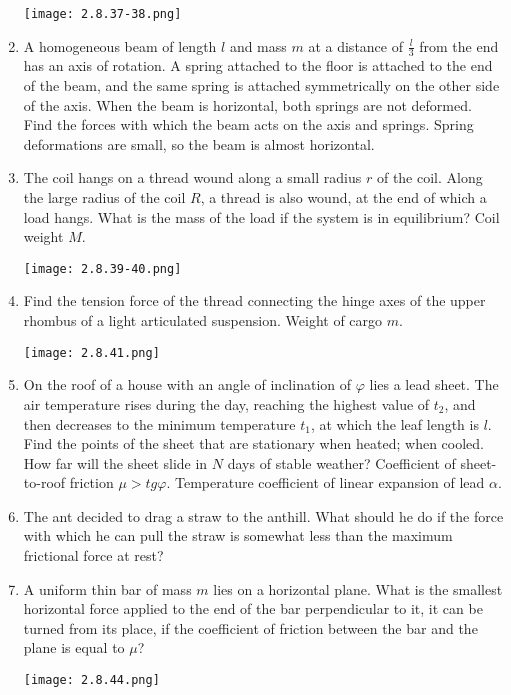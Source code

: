 \documentclass{article}
\begin{document}
\begin{enumerate}[label=2.8.\arabic*]
\begin{center}
    \texttt{[image: 2.8.37-38.png]}
\end{center}

\item A homogeneous beam of length $l$ and mass $m$ at a distance of $\frac{l}{3}$ from the end has an axis of rotation. A spring attached to the floor is attached to the end of the beam, and the same spring is attached symmetrically on the other side of the axis. When the beam is horizontal, both springs are not deformed. Find the forces with which the beam acts on the axis and springs. Spring deformations are small, so the beam is almost horizontal.

\item The coil hangs on a thread wound along a small radius $r$ of the coil. Along the large radius of the coil $R$, a thread is also wound, at the end of which a load hangs. What is the mass of the load if the system is in equilibrium? Coil weight $M$.

\begin{center}
    \texttt{[image: 2.8.39-40.png]}
\end{center}

\item Find the tension force of the thread connecting the hinge axes of the upper rhombus of a light articulated suspension. Weight of cargo $m$.

\begin{center}
    \texttt{[image: 2.8.41.png]}
\end{center}

\item On the roof of a house with an angle of inclination of $\varphi$ lies a lead sheet. The air temperature rises during the day, reaching the highest value of $t_2$, and then decreases to the minimum temperature $t_1$, at which the leaf length is $l$. Find the points of the sheet that are stationary when heated; when cooled. How far will the sheet slide in $N$ days of stable weather? Coefficient of sheet-to-roof friction $\mu > tg \varphi$. Temperature coefficient of linear expansion of lead $\alpha$.

\item The ant decided to drag a straw to the anthill. What should he do if the force with which he can pull the straw is somewhat less than the maximum frictional force at rest?

\item A uniform thin bar of mass $m$ lies on a horizontal plane. What is the smallest horizontal force applied to the end of the bar perpendicular to it, it can be turned from its place, if the coefficient of friction between the bar and the plane is equal to $\mu$?

\begin{center}
    \texttt{[image: 2.8.44.png]}
\end{center}




\end{enumerate}
\end{document}
